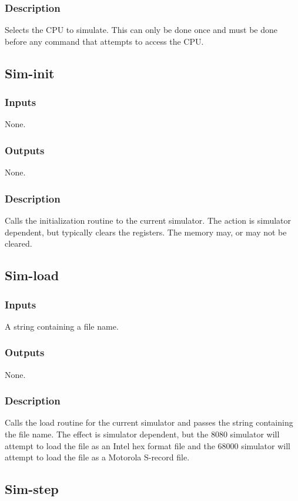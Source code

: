 \documentclass[10pt, openany]{book}
\begin{document}
\subsubsection{Description}
Selects the CPU to simulate.  This can only be done once and must be done before any command that attempts to access the CPU.

\subsection{Sim-init}
\subsubsection{Inputs}
None.
\subsubsection{Outputs}
None.
\subsubsection{Description}
Calls the initialization routine to the current simulator.  The action is simulator dependent, but typically clears the registers.  The memory may, or may not be cleared.

\subsection{Sim-load}
\subsubsection{Inputs}
A string containing a file name.
\subsubsection{Outputs}
None.
\subsubsection{Description}
Calls the load routine for the current simulator and passes the string containing the file name.  The effect is simulator dependent, but the 8080 simulator will attempt to load the file as an Intel hex format file and the 68000 simulator will attempt to load the file as a Motorola S-record file.

\subsection{Sim-step}
\end{document}
